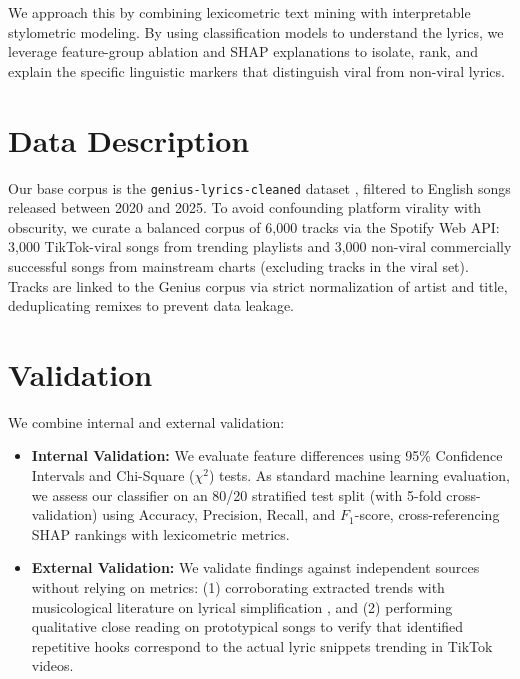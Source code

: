 \documentclass[11pt, a4paper]{article}
\begin{document}
We approach this by combining lexicometric text mining with interpretable stylometric modeling. By using classification models to understand the lyrics, we leverage feature-group ablation and SHAP explanations to isolate, rank, and explain the specific linguistic markers that distinguish viral from non-viral lyrics.

\section*{Data Description}
Our base corpus is the \texttt{genius-lyrics-cleaned} dataset \cite{christopher_dickinson_2026}, filtered to English songs released between 2020 and 2025. To avoid confounding platform virality with obscurity, we curate a balanced corpus of 6,000 tracks via the Spotify Web API: 3,000 TikTok-viral songs from trending playlists and 3,000 non-viral commercially successful songs from mainstream charts (excluding tracks in the viral set). Tracks are linked to the Genius corpus via strict normalization of artist and title, deduplicating remixes to prevent data leakage.

\section*{Validation}
We combine internal and external validation:
\begin{itemize}[noitemsep,topsep=2pt]
    \item \textbf{Internal Validation:} We evaluate feature differences using 95\% Confidence Intervals and Chi-Square ($\chi^2$) tests. As standard machine learning evaluation, we assess our classifier on an 80/20 stratified test split (with 5-fold cross-validation) using Accuracy, Precision, Recall, and $F_1$-score, cross-referencing SHAP rankings with lexicometric metrics.
    \item \textbf{External Validation:} We validate findings against independent sources without relying on metrics: (1) corroborating extracted trends with musicological literature on lyrical simplification \cite{Cabaleiro2024,fernandez2026}, and (2) performing qualitative close reading on prototypical songs to verify that identified repetitive hooks correspond to the actual lyric snippets trending in TikTok videos.
\end{itemize}



\end{document}

